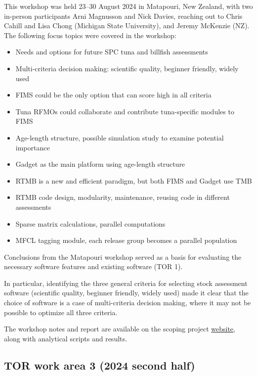 \documentclass{SCreport}
\newcommand\tree
{https://github.com/PacificCommunity/ofp-sam-transition-plan/tree/main}
\begin{document}
This workshop was held 23--30 August 2024 in Matapouri, New Zealand, with two
in-person participants Arni Magnusson and Nick Davies, reaching out to Chris
Cahill and Lisa Chong (Michigan State University), and Jeremy McKenzie (NZ). The
following focus topics were covered in the workshop:

\begin{itemize}
  \item Needs and options for future SPC tuna and billfish assessments
  \item Multi-criteria decision making: scientific quality, beginner friendly,
  widely used
  \item FIMS could be the only option that can score high in all criteria
  \item Tuna RFMOs could collaborate and contribute tuna-specific modules to
  FIMS
  \item Age-length structure, possible simulation study to examine potential
  importance
  \item Gadget as the main platform using age-length structure
  \item RTMB is a new and efficient paradigm, but both FIMS and Gadget use TMB
  \item RTMB code design, modularity, maintenance, reusing code in different
  assessments
  \item Sparse matrix calculations, parallel computations
  \item MFCL tagging module, each release group becomes a parallel population
\end{itemize}

\vspace{1ex}

Conclusions from the Matapouri workshop served as a basis for evaluating the
necessary software features and existing software (TOR 1).

In particular, identifying the three general criteria for selecting stock
assessment software (scientific quality, beginner friendly, widely used) made it
clear that the choice of software is a case of multi-criteria decision making,
where it may not be possible to optimize all three criteria.

The workshop notes and report are available on the scoping project
\href{\tree/workshops/2024-08-matapouri}{website}, along with analytical scripts
and results.

\vspace{2ex}

\subsection{TOR work area 3 (2024 second half)}
\end{document}
